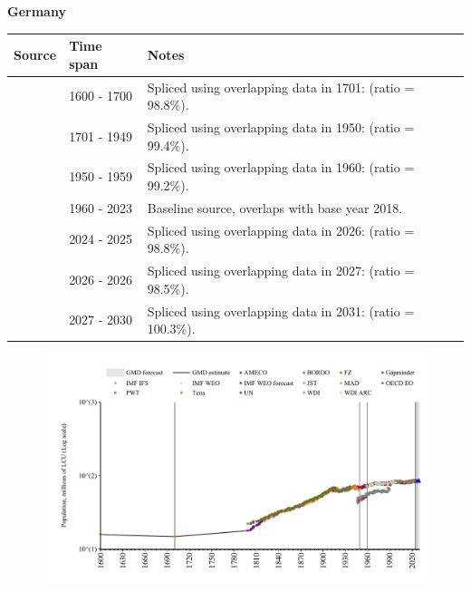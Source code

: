 \documentclass[12pt,a4paper,landscape]{article}
\begin{document}
\begin{adjustbox}{max totalsize={\paperwidth}{\paperheight},center}
\begin{minipage}[t][\textheight][t]{\textwidth}
\vspace*{0.5cm}
{}
\begin{center}
{\Large\bfseries Germany}
\end{center}
\vspace{0.5cm}
\begin{table}[H]
\centering
\small
\begin{tabular}{|l|l|l|}
\hline
\textbf{Source} & \textbf{Time span} & \textbf{Notes} \\
\hline
\rowcolor{white}\cite{MAD}& 1600 - 1700 &Spliced using overlapping data in 1701: (ratio = 98.8\%).\\
\rowcolor{lightgray}\cite{Gapminder}& 1701 - 1949 &Spliced using overlapping data in 1950: (ratio = 99.4\%).\\
\rowcolor{white}\cite{IMF_IFS}& 1950 - 1959 &Spliced using overlapping data in 1960: (ratio = 99.2\%).\\
\rowcolor{lightgray}\cite{WDI}& 1960 - 2023 &Baseline source, overlaps with base year 2018.\\
\rowcolor{white}\cite{OECD_EO}& 2024 - 2025 &Spliced using overlapping data in 2026: (ratio = 98.8\%).\\
\rowcolor{lightgray}\cite{AMECO}& 2026 - 2026 &Spliced using overlapping data in 2027: (ratio = 98.5\%).\\
\rowcolor{white}\cite{Gapminder}& 2027 - 2030 &Spliced using overlapping data in 2031: (ratio = 100.3\%).\\
\hline
\end{tabular}
\end{table}
\begin{figure}[H]
\centering
\includegraphics[width=\textwidth,height=0.6\textheight,keepaspectratio]{graphs/DEU_pop.pdf}
\end{figure}
\end{minipage}
\end{adjustbox}
\end{document}
